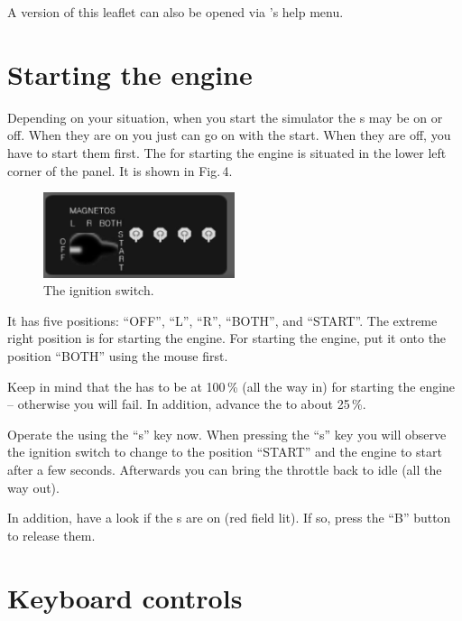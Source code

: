 \noindent
A version of this leaflet can also be opened via \FlightGear{}'s help menu.

\section{Starting the engine}

Depending on your situation, when you start the simulator the
s may be on or off. When they are on you just can go on
with the start. When they are off, you have to start them first. The
 for starting the engine is situated in the
lower left corner of the panel. It is shown in Fig.\,4.

\begin{figure}[!htp]
\centering
\includegraphics[width=0.5\textwidth]{magnet2}
\caption{The ignition switch.}
\end{figure}

It has five positions: ``OFF'', ``L'', ``R'', ``BOTH'', and ``START''. 
The extreme right position is for starting the engine. For starting the
engine, put it onto the position ``BOTH'' using the mouse first.

Keep in mind that the  has to be at 100\,\% (all
the way in) for starting the engine -- otherwise you will fail. In
addition, advance the  to about 25\,\%.

Operate the  using the ``s'' key now. When pressing the
``s'' key you will observe the ignition switch to change to the
position ``START'' and the engine to start after a few seconds. 
Afterwards you can bring the throttle back to idle (all the way out).

In addition, have a look if the s are on (red
field lit). If so, press the ``B'' button to release them.

\section{Keyboard controls}

